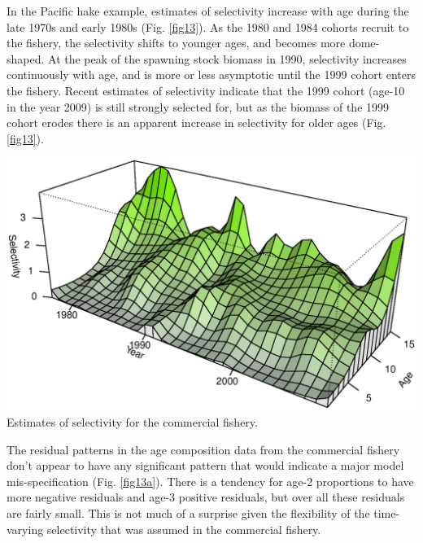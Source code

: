 \begin{multicols}{2}
In the Pacific hake example, estimates of selectivity increase with age during the late 1970s and early 1980s (Fig. \ref{fig13}).  As the 1980 and 1984 cohorts recruit to the fishery, the selectivity shifts to younger ages, and becomes more dome-shaped.  At the peak of the spawning stock biomass in 1990, selectivity increases continuously with age, and is more or less asymptotic until the 1999 cohort enters the fishery.  Recent estimates of selectivity indicate that the 1999 cohort (age-10 in the year 2009) is still strongly selected for, but as the biomass of the 1999 cohort erodes there is an apparent increase in selectivity for older ages (Fig. \ref{fig13}).

\begin{figurehere}
	\centering
	\includegraphics[width=\columnwidth]{iscamFigs/phakefig9a.eps}\\
	\caption{Estimates of selectivity for the commercial fishery.}\label{fig13}
\end{figurehere}

The residual patterns in the age composition data from the commercial fishery don't appear to have any significant pattern that would indicate a major model mis-specification (Fig. \ref{fig13a}).  There is a tendency for age-2 proportions to have more negative residuals and age-3 positive residuals, but over all these residuals are fairly small.  This is not much of a surprise given the flexibility of the time-varying selectivity that was assumed in the commercial fishery.


\end{multicols}

